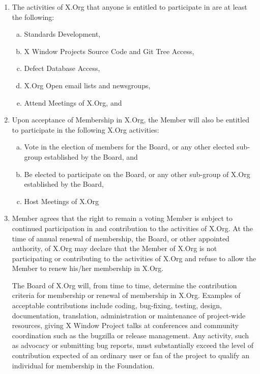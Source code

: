 \documentclass[10pt, english]{xorgdocs}
\begin{document}
\begin{enumerate}[(1)\hspace{.2cm}]
	\item The activities of X.Org that anyone is entitled to participate
	in are at least the following:

	\begin{enumerate}[(a)\hspace{.2cm}]
		\item Standards Development,
		\item X Window Projects Source Code and Git Tree Access,
		\item Defect Database Access,
		\item X.Org Open email lists and newsgroups,
		\item Attend Meetings of X.Org, and
	\end{enumerate}

	\item Upon acceptance of Membership in X.Org, the Member will also be
	entitled to participate in the following X.Org activities:

	\begin{enumerate}[(a)\hspace{.2cm}]
		\item Vote in the election of members for the Board, or any
		other elected sub-group established by the Board, and
		\item Be elected to participate on the Board, or any other
		sub-group of X.Org established by the Board,
		\item Host Meetings of X.Org
	\end{enumerate}

	\item Member agrees that the right to remain a voting Member is
	subject to continued participation in and contribution to the
	activities of X.Org. At the time of annual renewal of membership,
	the Board, or other appointed authority, of X.Org may declare that
	the Member of X.Org is not participating or contributing to the
	activities of X.Org and refuse to allow the Member to renew his/her
	membership in X.Org.

	The Board of X.Org will, from time to time, determine the contribution
	criteria for membership or renewal of membership in X.Org. Examples
	of acceptable contributions include coding, bug-fixing, testing,
	design, documentation, translation, administration or maintenance of
	project-wide resources, giving X Window Project talks at conferences and
	community coordination such as the bugzilla or release management.
	Any activity, such as advocacy or submitting bug reports, must
	substantially exceed the level of contribution expected of an ordinary
	user or fan of the project to qualify an individual for membership in
	the Foundation.


\end{enumerate}
\end{document}
